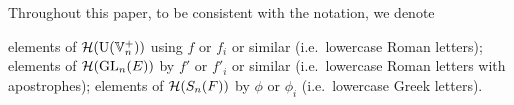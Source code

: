 Throughout this paper, to be consistent with the notation, we denote
\begin{itemize}
  \ii elements of $\mathcal H(\operatorname{U}(\mathbb V_n^+))$ using $f$ or $f_i$ or similar
    (i.e.\ lowercase Roman letters);
  \ii elements of $\mathcal H(\operatorname{GL}_n(E))$ by $f'$ or $f'_i$ or similar
    (i.e.\ lowercase Roman letters with apostrophes);
  \ii elements of $\mathcal H(S_n(F))$ by $\phi$ or $\phi_i$
    (i.e.\ lowercase Greek letters).
\end{itemize}
